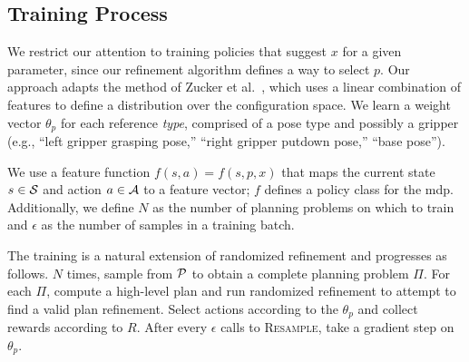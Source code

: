 
\subsection{Training Process}
We restrict our attention to training policies that suggest $x$ for a
given parameter, since our refinement algorithm defines a way to select
$p$. Our approach adapts the method of Zucker et
al.~\cite{workspacebias}, which uses a linear combination of features
to define a distribution over the configuration space. We learn a weight vector
$\theta_{p}$ for each reference \emph{type}, comprised of a pose type
and possibly a gripper (e.g., ``left gripper grasping pose,'' ``right
gripper putdown pose,'' ``base pose'').

We use a feature function $f(s, a) = f(s, p, x)$ that maps the current
state $s \in \mathcal{S}$ and action $a \in \mathcal{A}$ to a feature vector; $f$
defines a policy class for the {\sc mdp}. Additionally, we define $N$
as the number of planning problems on which to train and $\epsilon$ as
the number of samples in a training batch.

The training is a natural extension of randomized refinement and
progresses as follows. $N$ times, sample from $\mathcal{P}$ to obtain a
complete planning problem $\Pi$. For each $\Pi$, compute a high-level plan
and run randomized refinement to attempt to find a valid
plan refinement. Select actions according to the $\theta_{p}$ and
collect rewards according to $R$. After every $\epsilon$ calls to
\textsc{Resample}, take a gradient step on $\theta_{p}$.

